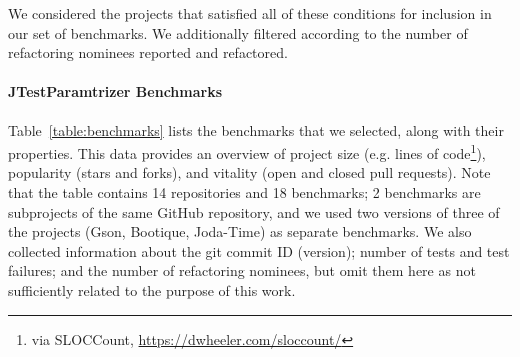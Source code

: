 We considered the projects that satisfied all of these conditions for inclusion in our set of benchmarks. We additionally filtered according to the number of refactoring nominees reported and refactored.

\paragraph{JTestParamtrizer Benchmarks}
Table~\ref{table:benchmarks} lists the benchmarks that we selected,
along with their properties. This data provides an overview of project
size (e.g. lines of code\footnote{via SLOCCount, \url{https://dwheeler.com/sloccount/}}), popularity (stars and forks), and vitality (open and
closed pull requests). Note that the table contains 14 repositories and 18 benchmarks; 2 benchmarks are subprojects of the same GitHub repository, and we used two versions of three of the projects (Gson, Bootique, Joda-Time) as separate benchmarks.
We also collected information about the git commit ID (version); number of tests and test failures; and the number of refactoring nominees, but omit them here as not sufficiently related to the purpose of this work.

\begin{table*}[h!]
\centering
{}
\caption{Numeric Characteristics of Benchmarks}
\label{table:benchmarks}
\end{table*}



